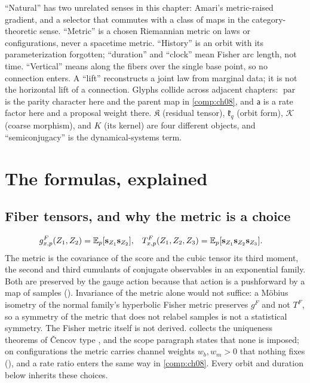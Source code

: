 ``Natural'' has two unrelated senses in this chapter: Amari's metric-raised gradient, and a selector
that commutes with a class of maps in the category-theoretic sense. ``Metric'' is a chosen Riemannian
metric on laws or configurations, never a spacetime metric. ``History'' is an orbit with its
parameterization forgotten; ``duration'' and ``clock'' mean Fisher arc length, not time.
``Vertical'' means along the fibers over the single base point, so no connection enters. A ``lift''
reconstructs a joint law from marginal data; it is not the horizontal lift of a connection. Glyphs
collide across adjacent chapters: $\operatorname{par}$ is the parity character here and the parent map
in \cref{comp:ch08}, and $\mathsf a$ is a rate factor here and a proposal weight there. $\mathfrak K$
(residual tensor), $\mathfrak k_q$ (orbit form), $\mathscr K$ (coarse morphism), and $K$ (its kernel)
are four different objects, and ``semiconjugacy'' is the dynamical-systems term.

\section{The formulas, explained}
\label{comp:ch07-formulas}

\subsection{Fiber tensors, and why the metric is a choice}
\label{comp:ch07-formulas-tensors}

\begin{align*}
g^F_{x,p}(Z_1,Z_2)&=\mathbb E_p[\mathbf s_{Z_1}\mathbf s_{Z_2}],
&
T^F_{x,p}(Z_1,Z_2,Z_3)&=\mathbb E_p[\mathbf s_{Z_1}\mathbf s_{Z_2}\mathbf s_{Z_3}].
\end{align*}
The metric is the covariance of the score and the cubic tensor its third moment, the second and third
cumulants of conjugate observables in an exponential family. Both are preserved by the gauge action
because that action is a pushforward by a map of samples ().
Invariance of the metric alone would not suffice: a M\"obius isometry of the normal family's
hyperbolic Fisher metric preserves $g^F$ and not $T^F$, so a symmetry of the metric that does not
relabel samples is not a statistical symmetry. The Fisher metric itself is not derived.
 collects the uniqueness theorems of \v{C}encov type
\citep{Cencov1982}, and the scope paragraph states that none is imposed; on configurations the metric
carries channel weights $w_b,w_m>0$ that nothing fixes (), and a
rate ratio enters the same way in \cref{comp:ch08}. Every orbit and duration below inherits these
choices.

